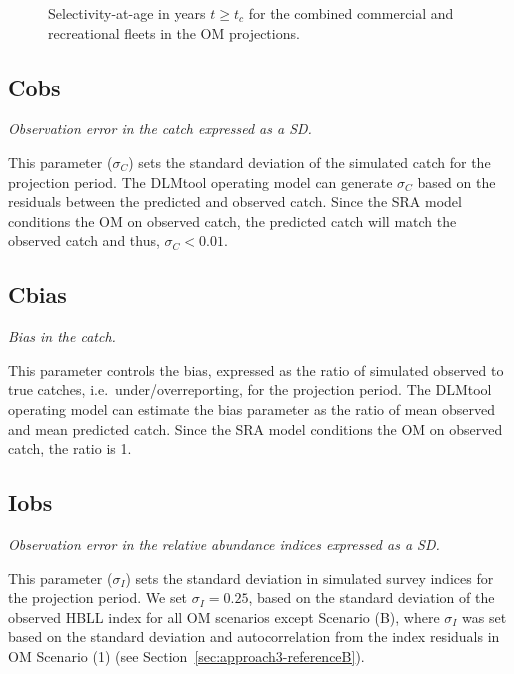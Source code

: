 \documentclass[11pt]{book}
\begin{document}
\begin{figure}[htb]

{\centering {} 

}

\caption{Selectivity-at-age in years \(t \geq t_c\) for the combined commercial and recreational fleets in the OM projections.}\label{fig:om-selectivity}
\end{figure}
\clearpage

\label{app:desc-obs-yelloweye}

\label{app:desc-obs-cobs-yelloweye}
\subsection{Cobs}

\emph{Observation error in the catch expressed as a SD.}

This parameter (\(\sigma_C\)) sets the standard deviation of the simulated catch for the projection period. The DLMtool operating model can generate \(\sigma_C\) based on the residuals between the predicted and observed catch. Since the SRA model conditions the OM on observed catch, the predicted catch will match the observed catch and thus, \(\sigma_C < 0.01\).

\label{app:desc-obs-cbias-yelloweye}
\subsection{Cbias}

\emph{Bias in the catch.}

This parameter controls the bias, expressed as the ratio of simulated observed to true catches, i.e.~under/overreporting, for the projection period. The DLMtool operating model can estimate the bias parameter as the ratio of mean observed and mean predicted catch. Since the SRA model conditions the OM on observed catch, the ratio is 1.

\label{app:desc-obs-iobs-yelloweye}
\subsection{Iobs}

\emph{Observation error in the relative abundance indices expressed as a SD.}

This parameter (\(\sigma_I\)) sets the standard deviation in simulated survey indices for the projection period. We set \(\sigma_I = 0.25\), based on the standard deviation of the observed HBLL index for all OM scenarios except Scenario (B), where \(\sigma_I\) was set based on the standard deviation and autocorrelation from the index residuals in OM Scenario (1) (see Section~\ref{sec:approach3-referenceB}).
\end{document}

